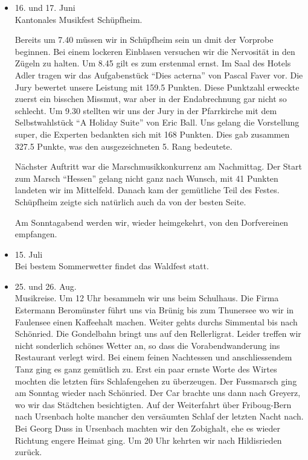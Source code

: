 \begin{history}
\begin{itemize}
        \item[]16. und 17. Juni\\
        Kantonales Musikfest Schüpfheim.

        Bereits um 7.40 müssen wir
        in Schüpfheim sein un dmit der Vorprobe beginnen. Bei einem lockeren
        Einblasen versuchen wir die Nervosität in den Zügeln zu halten. Um 8.45
        gilt es zum erstenmal ernst. Im Saal des Hotels Adler tragen wir das
        Aufgabenstück \enquote{Dies acterna} von Pascal Faver vor. Die Jury
        bewertet unsere Leistung mit 159.5 Punkten. Diese Punktzahl erweckte
        zuerst ein bisschen Missmut, war aber in der Endabrechnung gar nicht so
        schlecht. Um 9.30 stellten wir uns der Jury in der Pfarrkirche mit dem
        Selbstwahlstück \enquote{A Holiday Suite} von Eric Ball. Uns gelang die
        Vorstellung super, die Experten bedankten sich mit 168 Punkten. Dies gab
        zusammen 327.5 Punkte, was den ausgezeichneten 5. Rang bedeutete.

        Nächster Auftritt war die Marschmusikkonkurrenz am Nachmittag. Der Start
        zum Marsch \enquote{Hessen} gelang nicht ganz nach Wunsch, mit 41
        Punkten landeten wir im Mittelfeld. Danach kam der gemütliche Teil des
        Festes. Schüpfheim zeigte sich natürlich auch da von der besten Seite.

        Am Sonntagabend werden wir, wieder heimgekehrt, von den Dorfvereinen
        empfangen.

        \item[]15. Juli\\
        Bei bestem Sommerwetter findet das Waldfest statt.

        \item[]25. und 26. Aug.\\
        Musikreise. Um 12 Uhr besammeln wir uns beim Schulhaus. Die Firma
        Estermann Beromünster führt uns via Brünig bis zum Thunersee wo wir in
        Faulensee einen Kaffeehalt machen. Weiter gehts durchs Simmental bis
        nach Schönried. Die Gondelbahn bringt uns auf den Rellerligrat. Leider
        treffen wir nicht sonderlich schönes Wetter an, so dass die
        Vorabendwanderung ins Restaurant verlegt wird. Bei einem feinen
        Nachtessen und anschliessendem Tanz ging es ganz gemütlich zu. Erst ein
        paar ernste Worte des Wirtes mochten die letzten fürs Schlafengehen zu
        überzeugen. Der Fussmarsch ging am Sonntag wieder nach Schönried. Der
        Car brachte uns dann nach Greyerz, wo wir das Städtchen besichtigten.
        Auf der Weiterfahrt über Friboug-Bern nach Ursenbach holte mancher den
        versäumten Schlaf der letzten Nacht nach. Bei Georg Duss in Ursenbach
        machten wir den Zobighalt, ehe es wieder Richtung engere Heimat ging. Um
        20 Uhr kehrten wir nach Hildisrieden zurück.


    \end{itemize}

\end{history}
